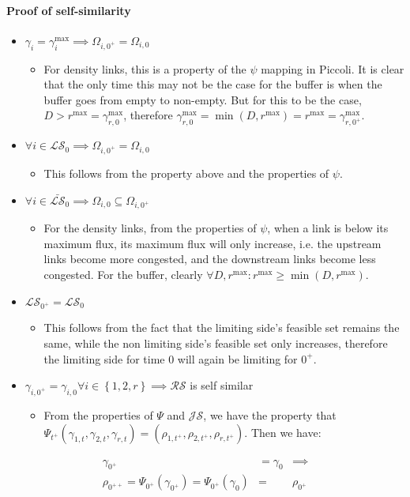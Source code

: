 \paragraph{Proof of self-similarity}
\begin{itemize}
\item $\gamma_{i}=\gamma_{i}^{\max}\implies\Omega_{i,0^{+}}=\Omega_{i,0}$

\begin{itemize}
\item For density links, this is a property of the $\psi$ mapping in Piccoli.
It is clear that the only time this may not be the case for the buffer
is when the buffer goes from empty to non-empty. But for this to be
the case, $D>r^{\max}=\gamma_{r,0}^{\max}$, therefore $\gamma_{r,0}^{\max}=\min\left(D,r^{\max}\right)=r^{\max}=\gamma_{r,0^{+}}^{\max}$.
\end{itemize}
\item $\forall i\in\mathcal{LS}_{0}\implies\Omega_{i,0^{+}}=\Omega_{i,0}$

\begin{itemize}
\item This follows from the property above and the properties of $\psi$.
\end{itemize}
\item $\forall i\in\bar{\mathcal{LS}}_{0}\implies\Omega_{i,0}\subseteq\Omega_{i,0^{+}}$

\begin{itemize}
\item For the density links, from the properties of $\psi$, when a link
is below its maximum flux, its maximum flux will only increase, i.e.
the upstream links become more congested, and the downstream links
become less congested. For the buffer, clearly $\forall D,r^{\max}:r^{\max}\ge\min\left(D,r^{\max}\right)$.
\end{itemize}
\item $\mathcal{LS}_{0^{+}}=\mathcal{LS}_{0}$

\begin{itemize}
\item This follows from the fact that the limiting side's feasible set remains
the same, while the non limiting side's feasible set only increases,
therefore the limiting side for time 0 will again be limiting for
$0^{+}$.
\end{itemize}
\item $\gamma_{i,0^{+}}=\gamma_{i,0}\forall i\in\left\{ 1,2,r\right\} \implies\mathcal{RS}$
is self similar

\begin{itemize}
\item From the properties of $\Psi$ and $\mathcal{JS}$, we have the property
that $\Psi_{t^{+}}\left(\gamma_{1,t},\gamma_{2,t},\gamma_{r,t}\right)=\left(\rho_{1,t^{+}},\rho_{2,t^{+}},\rho_{r,t^{+}}\right)$. Then we have:
\end{itemize}
\end{itemize}
\begin{eqnarray*}
\gamma_{0^{+}} & =\gamma_{0} & \implies\\
\rho_{0^{++}}=\Psi_{0^{+}}\left(\gamma_{0^{+}}\right)=\Psi_{0^{+}}\left(\gamma_{0}\right) & = & \rho_{0^{+}}
\end{eqnarray*}


